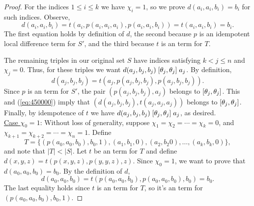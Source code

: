 \begin{proof}
For the indices $1\leq i \leq k$ we have $\chi_i =1$, so we prove
$d(a_i,a_i,b_i) = b_i$ for such indices. Observe,
\[
  d(a_i,a_i,b_i) =
  t(a_i, p(a_i,a_i,a_i), p(a_i,a_i,b_i)) %
  =t(a_i, a_i, b_i) %
  =b_i. %
\]
The first equation holds by definition of $d$, the second
because $p$ is an idempotent local difference term for
$S'$, and the third because $t$ is an \ld term for $T$.

The remaining triples in our original set $S$
have indices satisfying $k<j\leq n$ and $\chi_j = 0$.
Thus, for these triples we want
$d(a_j,b_j,b_j)\mathrel{[\theta_j, \theta_j]} a_j$.
By definition,
\begin{equation}
  \label{eq:450000}
d(a_j,b_j,b_j) =t(a_j, p(a_j,b_j,b_j), p(a_j,b_j,b_j)).
\end{equation}
Since $p$ is an \ld term for $S'$, %
the pair $(p(a_j,b_j,b_j), a_j)$ belongs to $[\theta_j, \theta_j]$.
This and
(\ref{eq:450000}) imply
that
$(d(a_j, b_j,b_j), t(a_j,a_j,a_j))$
belongs to
$[\theta_j, \theta_j]$.
Finally, by idempotence of $t$ we have
$d(a_j,b_j,b_j)\mathrel{[\theta_j, \theta_j]} a_j$,
as desired.
\\[4pt]
\underline{Case $\chi_0 = 1$}:
Without loss of generality, suppose $\chi_1 = \chi_2 =\cdots =\chi_k = 0$,
and $\chi_{k+1} = \chi_{k+2} = \cdots = \chi_{n} = 1$. Define
\[
T = \{(p(a_0, a_0, b_0), b_0, 1),
(a_1, b_1, 0), (a_2, b_2 0), \dots, (a_k, b_k, 0)\},
\]
and note that $|T| < |S|$.
Let $t$ be an \ld term for $T$ and
define
$d(x,y,z) = t(p(x,y,z), p(y,y,z), z)$.
Since $\chi_0 =1$, we want to prove that 
$d(a_0,a_0,b_0) = b_0$. By the definition of
$d$,
\begin{equation*}  d(a_0,a_0,b_0) =
  t(p(a_0,a_0,b_0), p(a_0,a_0,b_0), b_0) =b_0.
\end{equation*}
The last equality holds since $t$ is an \ld term for $T$, so it's 
an \ld term for $(p(a_0, a_0, b_0), b_0, 1)$.


\end{proof}
